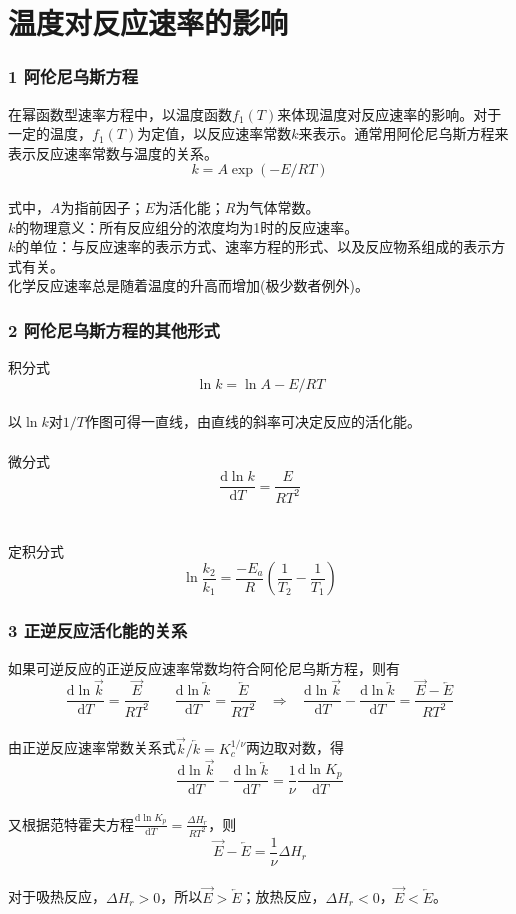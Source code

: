 
\section{温度对反应速率的影响}
\begin{frame}
	\frametitle{1 阿伦尼乌斯方程}
        在幂函数型速率方程中，以温度函数$f_1(T)$来体现温度对反应速率的影响。对于一定的温度，$f_1(T)$为定值，以反应速率常数$k$来表示。通常用阿伦尼乌斯方程来表示反应速率常数与温度的关系。
    $$k = A\exp(-E/RT) $$\\
    式中，$A$为指前因子；$E$为活化能；$R$为气体常数。\pause
    \\$k$的物理意义：所有反应组分的浓度均为1时的反应速率。\pause
    \\$k$的单位：与反应速率的表示方式、速率方程的形式、以及反应物系组成的表示方式有关。\pause
    \\化学反应速率总是随着温度的升高而增加(极少数者例外)。
\end{frame}


\begin{frame}
	\frametitle{2 阿伦尼乌斯方程的其他形式}
	积分式
	$$\ln{k}=\ln{A}-E/RT$$\\
	以$\ln{k}$对$1/T$作图可得一直线，由直线的斜率可决定反应的活化能。
	\\~
	\\微分式
	$$\frac{\mathrm{d}\ln{k}}{\mathrm{d}T} =\frac{E}{RT^2}$$
	\\~
	\\定积分式
	$$\ln\frac{k_2}{k_1}=\frac{-E_a}{R}(\frac{1}{T_2}-\frac{1}{T_1})$$	
\end{frame}


\begin{frame}
	\frametitle{3 正逆反应活化能的关系}
	如果可逆反应的正逆反应速率常数均符合阿伦尼乌斯方程，则有
	$$\frac{\mathrm{d}\ln\overrightarrow{k}}{\mathrm{d}T} =\frac{\overrightarrow{E}}{RT^2}~~~~~~~~
	\frac{\mathrm{d}\ln\overleftarrow{k}}{\mathrm{d}T} =\frac{\overleftarrow{E}}{RT^2}~~~~\Rightarrow ~~~~\frac{\mathrm{d}\ln\overrightarrow{k}}{\mathrm{d}T}-\frac{\mathrm{d}\ln\overleftarrow{k}}{\mathrm{d}T}=\frac{\overrightarrow{E}-\overleftarrow{E}}{RT^2}$$
	\\由正逆反应速率常数关系式$\overrightarrow{k}/\overleftarrow{k}=K_c^{1/\nu}$两边取对数，得
	$$\frac{\mathrm{d}\ln\overrightarrow{k}}{\mathrm{d}T}-\frac{\mathrm{d}\ln\overleftarrow{k}}{\mathrm{d}T}=\frac{1}{\nu}\frac{\mathrm{d}\ln{K_p}}{\mathrm{d}T}$$\pause
	\\又根据范特霍夫方程$\frac{\mathrm{d}\ln{K_p}}{\mathrm{d}T}=\frac{\Delta{H_r}}{RT^2}$，则
	$$\overrightarrow{E}-\overleftarrow{E}=\frac{1}{\nu}\Delta{H_r}$$
	\\对于吸热反应，$\Delta{H_r}>0$，所以$\overrightarrow{E}>\overleftarrow{E}$；放热反应，$\Delta{H_r}<0$，$\overrightarrow{E}<\overleftarrow{E}$。
\end{frame}


